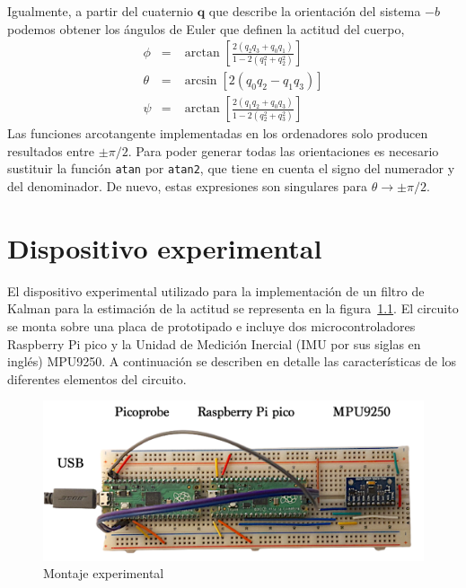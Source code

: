 \documentclass[a4paper,12pt]{book}
\begin{document}
Igualmente, a partir del cuaternio $\mathbf{q}$ que describe la orientación del sistema $-b$ podemos obtener los ángulos de Euler que definen la actitud del cuerpo,
\begin{eqnarray}
    \phi &=& \arctan\left[\frac{2(q_2q_3 + q_0q_1)}{1 - 2(q_1^2 + q_2^2)}\right]\\
    \theta &=& \arcsin\left[ 2(q_0q_2 - q_1q_3)\right]\\
    \psi &=& \arctan\left[\frac{2(q_1q_2 + q_0q_3)}{1 - 2(q_2^2 + q_3^2)}\right]
\end{eqnarray}
Las funciones arcotangente implementadas en los ordenadores solo producen resultados entre $\pm\pi/2$. Para poder generar todas las orientaciones es necesario sustituir la función \texttt{atan} por \texttt{atan2}, que tiene en cuenta el signo del numerador y del denominador. De nuevo, estas expresiones son singulares para $\theta\rightarrow \pm \pi/2$.



\chapter{Dispositivo experimental}\label{chapter:setup}

El dispositivo experimental utilizado para la implementación de un filtro de Kalman para la estimación de la actitud se representa en la figura~\ref{fig:experimental setup}. El circuito se monta sobre una placa de prototipado e incluye dos microcontroladores Raspberry Pi pico y la Unidad de Medición Inercial (IMU por sus siglas en inglés) MPU9250. A continuación se describen en detalle las características de los diferentes elementos del circuito.

\begin{figure}[!ht]
    \centering
	\includegraphics[width=0.8\linewidth]{Figures/experimental_setup_nobckgd_notes.png}
 	\caption{Montaje experimental}
 	\label{fig:experimental setup}
\end{figure}


\end{document}
